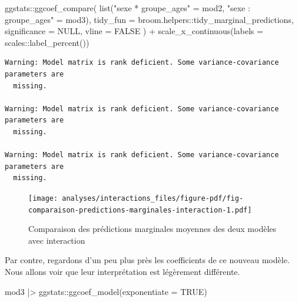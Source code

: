 \documentclass[
  letterpaper,
  DIV=11,
  numbers=noendperiod,
  oneside]{scrreprt}
\newenvironment{Shaded}{\begin{snugshade}}{\end{snugshade}}
\newcommand{\AttributeTok}[1]{\textcolor[rgb]{0.40,0.45,0.13}{#1}}
\newcommand{\ConstantTok}[1]{\textcolor[rgb]{0.56,0.35,0.01}{#1}}
\newcommand{\FunctionTok}[1]{\textcolor[rgb]{0.28,0.35,0.67}{#1}}
\newcommand{\NormalTok}[1]{\textcolor[rgb]{0.00,0.23,0.31}{#1}}
\newcommand{\OtherTok}[1]{\textcolor[rgb]{0.00,0.23,0.31}{#1}}
\newcommand{\SpecialCharTok}[1]{\textcolor[rgb]{0.37,0.37,0.37}{#1}}
\newcommand{\StringTok}[1]{\textcolor[rgb]{0.13,0.47,0.30}{#1}}
\begin{document}
\begin{Shaded}
\begin{Highlighting}[]
\NormalTok{ggstats}\SpecialCharTok{::}\FunctionTok{ggcoef\_compare}\NormalTok{(}
  \FunctionTok{list}\NormalTok{(}\StringTok{"sexe * groupe\_ages"} \OtherTok{=}\NormalTok{ mod2, }\StringTok{"sexe : groupe\_ages"} \OtherTok{=}\NormalTok{ mod3),}
  \AttributeTok{tidy\_fun =}\NormalTok{ broom.helpers}\SpecialCharTok{::}\NormalTok{tidy\_marginal\_predictions,}
  \AttributeTok{significance =} \ConstantTok{NULL}\NormalTok{,}
  \AttributeTok{vline =} \ConstantTok{FALSE}
\NormalTok{) }\SpecialCharTok{+}
  \FunctionTok{scale\_x\_continuous}\NormalTok{(}\AttributeTok{labels =}\NormalTok{ scales}\SpecialCharTok{::}\FunctionTok{label\_percent}\NormalTok{())}
\end{Highlighting}
\end{Shaded}

\begin{verbatim}
Warning: Model matrix is rank deficient. Some variance-covariance parameters are
  missing.

Warning: Model matrix is rank deficient. Some variance-covariance parameters are
  missing.

Warning: Model matrix is rank deficient. Some variance-covariance parameters are
  missing.
\end{verbatim}

\begin{figure}[H]

{\centering \texttt{[image: analyses/interactions\_files/figure-pdf/fig-comparaison-predictions-marginales-interaction-1.pdf]}

}

\caption{\label{fig-comparaison-predictions-marginales-interaction}Comparaison
des prédictions marginales moyennes des deux modèles avec interaction}

\end{figure}

Par contre, regardons d'un peu plus près les coefficients de ce nouveau
modèle. Nous allons voir que leur interprétation est légèrement
différente.

\begin{Shaded}
\begin{Highlighting}[]
\NormalTok{mod3 }\SpecialCharTok{|\textgreater{}} 
\NormalTok{  ggstats}\SpecialCharTok{::}\FunctionTok{ggcoef\_model}\NormalTok{(}\AttributeTok{exponentiate =} \ConstantTok{TRUE}\NormalTok{)}
\end{Highlighting}
\end{Shaded}
\end{document}
